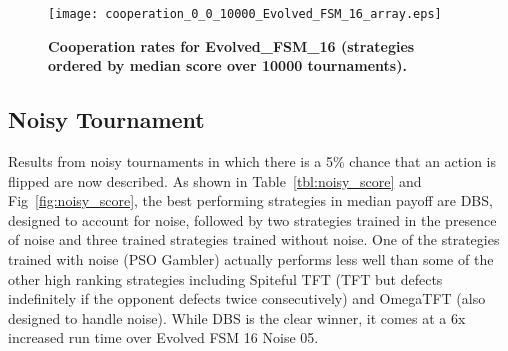 \documentclass[10pt,letterpaper]{article}
\begin{document}
\begin{figure}[!hbtp]
        \centering
        \texttt{[image: cooperation\_0\_0\_10000\_Evolved\_FSM\_16\_array.eps]}
        \caption{\bf Cooperation rates for Evolved\_FSM\_16 
            (strategies ordered by median score over 10000 tournaments).}
        \label{fig:comparison_cooperation_heatmaps_standard_3}
\end{figure}

\subsection*{Noisy Tournament}\label{sec:noise}

Results from noisy tournaments in which there is a 5\% chance that an action is
flipped are now described. As shown in Table~\ref{tbl:noisy_score} and
Fig~\ref{fig:noisy_score}, the best performing strategies in median payoff
are DBS, designed to account for noise, followed by two strategies trained in
the presence of noise and three trained strategies trained without noise. One of
the strategies trained with noise (PSO Gambler) actually performs less well than
some of the other high ranking strategies including
Spiteful TFT (TFT but defects indefinitely if the opponent defects twice
consecutively) and OmegaTFT (also designed to handle noise). While DBS is the clear
winner, it comes at a 6x increased run time over Evolved FSM 16 Noise 05.
\end{document}
